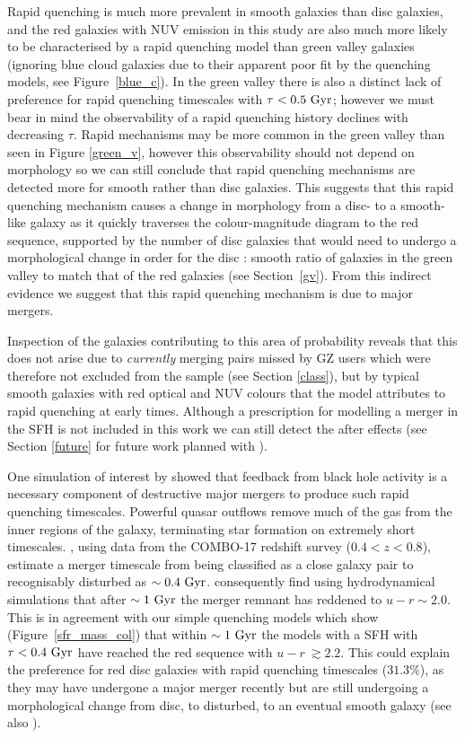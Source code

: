 Rapid quenching is much more prevalent in smooth galaxies than disc galaxies, and the red galaxies with NUV emission in this study are also much more likely to be characterised by a rapid quenching model than green valley galaxies (ignoring blue cloud galaxies due to their apparent poor fit by the quenching models, see Figure~\ref{blue_c}). In the green valley there is also a distinct lack of preference for rapid quenching timescales with $\tau < 0.5~\rm{Gyr}$; however we must bear in mind the observability of a rapid quenching history declines with decreasing $\tau$. Rapid mechanisms may be more common in the green valley than seen in Figure \ref{green_v}, however this observability should not depend on morphology so we can still conclude that rapid quenching mechanisms are detected more for smooth rather than disc galaxies. This suggests that this rapid quenching mechanism causes a change in morphology from a disc- to a smooth-like galaxy as it quickly traverses the colour-magnitude diagram to the red sequence, supported by the number of disc galaxies that would need to undergo a morphological change in order for the disc : smooth ratio of galaxies in the green valley to match that of the red galaxies (see Section~\ref{gv}). From this indirect evidence we suggest that this rapid quenching mechanism is due to major mergers.

Inspection of the galaxies contributing to this area of probability reveals that this does not arise due to \emph{currently} merging pairs missed by GZ users which were therefore not excluded from the sample (see Section \ref{class}), but by typical smooth galaxies with red optical and NUV colours that the model attributes to rapid quenching at early times. Although a prescription for modelling a merger in the SFH is not included in this work we can still detect the after effects (see Section \ref{future} for future work planned with \starpy).

One simulation of interest by \citet{springel05b} showed that feedback from black hole activity is a necessary component of destructive major mergers to produce such rapid quenching timescales. Powerful quasar outflows remove much of the gas from the inner regions of the galaxy, terminating star formation on extremely short timescales. \citet{Bell06}, using data from the COMBO-17 redshift survey ($0.4 < z < 0.8$), estimate a merger timescale from being classified as a close galaxy pair to recognisably disturbed as $\sim 0.4~\rm{Gyr}$. \citet{springel05b} consequently find using hydrodynamical simulations that after $\sim1~\rm{Gyr}$ the merger remnant has reddened to $u-r \sim 2.0$. This is in agreement with our simple quenching models which show (Figure~\ref{sfr_mass_col}) that within $\sim1~\rm{Gyr}$ the models with a SFH with $\tau < 0.4~\rm{Gyr}$ have reached the red sequence with $u-r ~\gtrsim 2.2$. This could explain the preference for red disc galaxies with rapid quenching timescales ($31.3\%$), as they may have undergone a major merger recently but are still undergoing a morphological change from disc, to disturbed, to an eventual smooth galaxy (see also \citealt{vdW09}).


